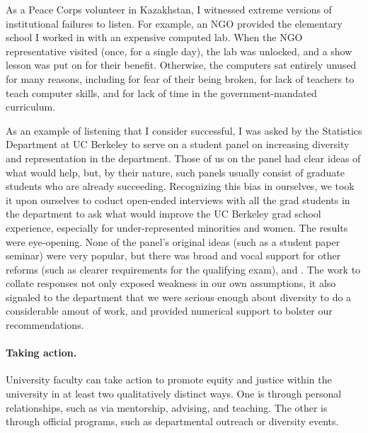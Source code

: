 As a Peace Corps volunteer in Kazakhstan, I witnessed extreme versions of
institutional failures to listen. For example, an NGO provided the elementary
school I worked in with an expensive computed lab.  When the NGO representative
visited (once, for a single day), the lab was unlocked, and a show lesson was
put on for their benefit.  Otherwise, the computers sat entirely unused for many
reasons, including for fear of their being broken, for lack of teachers to teach
computer skills, and for lack of time in the government-mandated curriculum.

As an example of listening that I consider successful, I was asked by the
Statistics Department at UC Berkeley to serve on a student panel on increasing
diversity and representation in the department.  Those of us on the panel had
clear ideas of what would help, but, by their nature, such panels usually
consist of graduate students who are already succeeding. Recognizing this bias
in ourselves, we took it upon ourselves to coduct open-ended interviews with all
the grad students in the department to ask what would improve the UC Berkeley
grad school experience, especially for under-represented minorities and women.
The results were eye-opening.  None of the panel's original ideas (such as a
student paper seminar) were very popular, but there was broad and vocal support
for other reforms (such as clearer requirements for the qualifying exam), and .
The work to collate responses not only exposed weakness in our own assumptions,
it also signaled to the department that we were serious enough about diversity
to do a considerable amout of work, and provided numerical support to bolster
our recommendations.

\paragraph{Taking action.}
%
University faculty can take action to promote equity and justice within the
university in at least two qualitatively distinct ways.  One is through personal
relationships, such as via mentorship, advising, and teaching.  The other is
through official programs, such as departmental outreach or diversity events.

